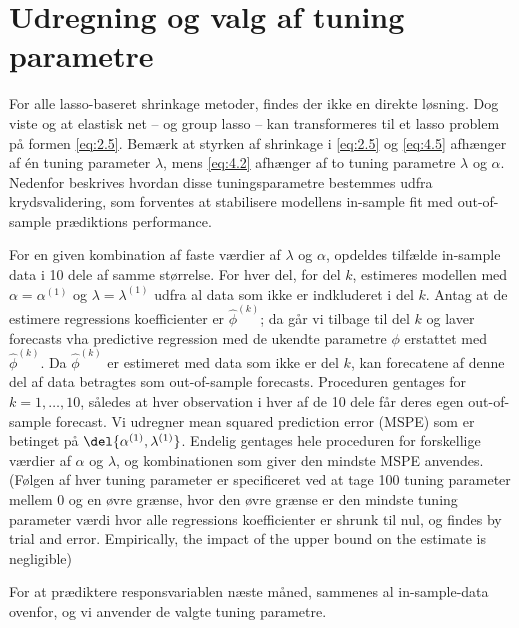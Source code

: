 \section{Udregning og valg af tuning parametre}
For alle lasso-baseret shrinkage metoder, findes der ikke en direkte løsning.
Dog viste \citep{zou_hastie} og \citep{group_lasso} at elastisk net -- og group lasso -- kan transformeres til et lasso problem på formen \eqref{eq:2.5}.
Bemærk at styrken af shrinkage i \eqref{eq:2.5} og \eqref{eq:4.5} afhænger af én tuning parameter \(\lambda\), mens \eqref{eq:4.2} afhænger af to tuning parametre \(\lambda\) og \(\alpha\).
Nedenfor beskrives hvordan disse tuningsparametre bestemmes udfra krydsvalidering, som forventes at stabilisere modellens in-sample fit med out-of-sample prædiktions performance.

For en given kombination af faste værdier af \(\lambda\) og \(\alpha\), opdeldes tilfælde in-sample data i 10 dele af samme størrelse.
For hver del, for del \(k\), estimeres modellen med \(\alpha = \alpha^{(1)}\) og \(\lambda = \lambda^{(1)}\) udfra al data som ikke er indkluderet i del \(k\).
Antag at de estimere regressions koefficienter er \(\hat{\phi}^{(k)}\); da går vi tilbage til del \(k\) og laver forecasts vha predictive regression med de ukendte parametre \(\phi\) erstattet med \(\hat{\phi}^{(k)}\).
Da \(\hat{\phi}^{(k)}\) er estimeret med data som ikke er del \(k\), kan forecatene af denne del af data betragtes som out-of-sample forecasts.
Proceduren gentages for \(k=1,\ldots,10\), således at hver observation i hver af de 10 dele får deres egen out-of-sample forecast.
Vi udregner mean squared prediction error (MSPE) som er betinget på \(\del{\alpha^{(1)}, \lambda^{(1)}}\).
Endelig gentages hele proceduren for forskellige værdier af \(\alpha\) og \(\lambda\), og kombinationen som giver den mindste MSPE anvendes.
(Følgen af hver tuning parameter er specificeret ved at tage 100 tuning parameter mellem 0 og en øvre grænse, hvor den øvre grænse er den mindste tuning parameter værdi hvor alle regressions koefficienter er shrunk til nul, og findes by trial and error.
Empirically, the impact of the upper bound on the estimate is negligible)

For at prædiktere responsvariablen næste måned, sammenes al in-sample-data ovenfor, og vi anvender de valgte tuning parametre.

